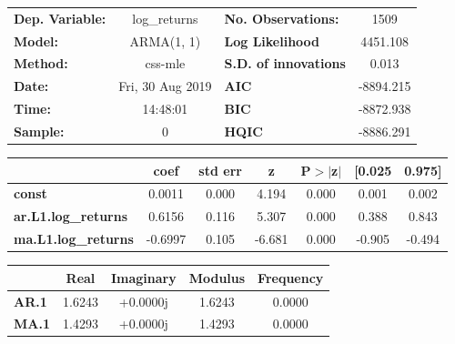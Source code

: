 \begin{center}
\begin{tabular}{lclc}
\toprule
\textbf{Dep. Variable:}     &        log\_returns       & \textbf{  No. Observations:  } &            1509            \\
\textbf{Model:}             &         ARMA(1, 1)        & \textbf{  Log Likelihood     } &          4451.108          \\
\textbf{Method:}            &          css-mle          & \textbf{  S.D. of innovations} &           0.013            \\
\textbf{Date:}              &      Fri, 30 Aug 2019     & \textbf{  AIC                } &         -8894.215          \\
\textbf{Time:}              &          14:48:01         & \textbf{  BIC                } &         -8872.938          \\
\textbf{Sample:}            &             0             & \textbf{  HQIC               } &         -8886.291          \\
\bottomrule
\end{tabular}
\begin{tabular}{lcccccc}
                            & \textbf{coef} & \textbf{std err} & \textbf{z} & \textbf{P$> |$z$|$} & \textbf{[0.025} & \textbf{0.975]}  \\
\midrule
\textbf{const}              &       0.0011  &        0.000     &     4.194  &         0.000        &        0.001    &        0.002     \\
\textbf{ar.L1.log\_returns} &       0.6156  &        0.116     &     5.307  &         0.000        &        0.388    &        0.843     \\
\textbf{ma.L1.log\_returns} &      -0.6997  &        0.105     &    -6.681  &         0.000        &       -0.905    &       -0.494     \\
\bottomrule
\end{tabular}
\begin{tabular}{lcccc}
              & \textbf{            Real} & \textbf{         Imaginary} & \textbf{         Modulus} & \textbf{        Frequency}  \\
\midrule
\textbf{AR.1} &                1.6243     &                +0.0000j     &                1.6243     &                0.0000       \\
\textbf{MA.1} &                1.4293     &                +0.0000j     &                1.4293     &                0.0000       \\
\bottomrule
\end{tabular}
\end{center}
